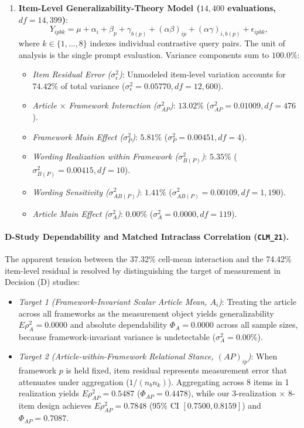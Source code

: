 \begin{enumerate}
    \item \textbf{Item-Level Generalizability-Theory Model ($14{,}400$ evaluations, $df = 14{,}399$)}:
    \begin{equation}
        Y_{ipbk} = \mu + \alpha_i + \beta_p + \gamma_{b(p)} + (\alpha\beta)_{ip} + (\alpha\gamma)_{i,b(p)} + \epsilon_{ipbk},
        \label{eq:item_level_gtheory}
    \end{equation}
    where $k \in \{1,\ldots,8\}$ indexes individual contrastive query pairs. The unit of analysis is the single prompt evaluation.
    Variance components sum to $100.0\%$:
    \begin{itemize}
        \item \emph{Item Residual Error ($\sigma^2_\epsilon$)}: Unmodeled item-level variation accounts for $\mathbf{74.42\%}$ of total variance ($\sigma^2_\epsilon = 0.05770, df = 12{,}600$).
        \item \emph{Article $\times$ Framework Interaction ($\sigma^2_{AP}$)}: $\mathbf{13.02\%}$ ($\sigma^2_{AP} = 0.01009, df = 476$).
        \item \emph{Framework Main Effect ($\sigma^2_P$)}: $\mathbf{5.81\%}$ ($\sigma^2_P = 0.00451, df = 4$).
        \item \emph{Wording Realization within Framework ($\sigma^2_{B(P)}$)}: $\mathbf{5.35\%}$ ($\sigma^2_{B(P)} = 0.00415, df = 10$).
        \item \emph{Wording Sensitivity ($\sigma^2_{AB(P)}$)}: $\mathbf{1.41\%}$ ($\sigma^2_{AB(P)} = 0.00109, df = 1{,}190$).
        \item \emph{Article Main Effect ($\sigma^2_A$)}: $\mathbf{0.00\%}$ ($\sigma^2_A = 0.0000, df = 119$).
    \end{itemize}
\end{enumerate}

\paragraph{D-Study Dependability and Matched Intraclass Correlation (\texttt{CLM\_21}).}
The apparent tension between the 37.32\% cell-mean interaction and the 74.42\% item-level residual is resolved by distinguishing the target of measurement in Decision (D) studies:
\begin{itemize}
    \item \emph{Target 1 (Framework-Invariant Scalar Article Mean, $A_i$)}: Treating the article across all frameworks as the measurement object yields generalizability $E\rho^2_A = 0.0000$ and absolute dependability $\Phi_A = 0.0000$ across all sample sizes, because framework-invariant variance is undetectable ($\sigma^2_A = 0.00\%$).
    \item \emph{Target 2 (Article-within-Framework Relational Stance, $(AP)_{ip}$)}: When framework $p$ is held fixed, item residual represents measurement error that attenuates under aggregation ($1/(n_b n_k)$). Aggregating across 8 items in 1 realization yields $E\rho^2_{AP} = 0.5487$ ($\Phi_{AP} = 0.4478$), while our 3-realization $\times$ 8-item design achieves $E\rho^2_{AP} = \mathbf{0.7848}$ (95\% CI $[0.7500, 0.8159]$) and $\Phi_{AP} = \mathbf{0.7087}$.
\end{itemize}


